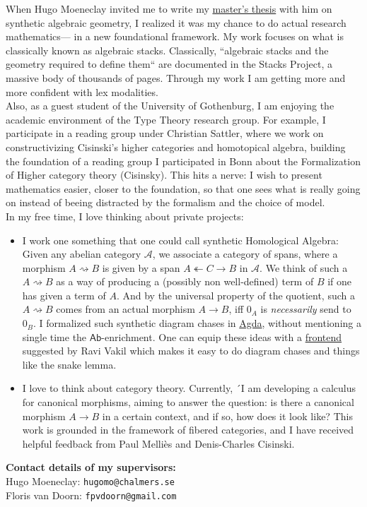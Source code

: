 \documentclass[12pt,headings=small,paper=A4,DIV=calc]{article}
\begin{document}
When Hugo Moeneclay invited me to write my \href{https://github.com/timlichtnau/MasterThesis/blob/Main}{master's thesis} with him on synthetic algebraic geometry, I realized it was my chance to do actual research mathematics--- in a new foundational framework. My work focuses on what is classically known as algebraic stacks. Classically, ``algebraic stacks and the geometry required to define them`` are documented in the Stacks Project, a massive body of thousands of pages. Through my work I am getting more and more confident with lex modalities. \\
Also, as a guest student of the University of Gothenburg, I am enjoying the academic environment of the Type Theory research group. For example, I participate in a reading group under Christian Sattler, where we work on constructivizing Cisinski's higher categories and homotopical algebra, building the foundation of a reading group I participated in Bonn about the Formalization of Higher category theory (Cisinsky). This hits a nerve: I wish to present mathematics easier, closer to the foundation, so that one sees what is really going on instead of beeing distracted by the formalism and the choice of model. \\

In my free time, I love thinking about private projects: 
\begin{itemize}
	\item I work one something that one could call synthetic Homological Algebra: Given any abelian category $\mathcal{A}$, we associate a category of spans, where a morphism $A \rightsquigarrow B$ is given by a span $A \twoheadleftarrow C \to B$ in $\mathcal{A}$. We think of such a $A \rightsquigarrow B$ as a way of producing a (possibly non well-defined) term of $B$ if one has given a term of $A$. And by the universal property of the quotient, such a $A \rightsquigarrow B$ comes from an actual morphism $A \to B$, iff $0_A$ is \emph{necessarily} send to $0_B$. I formalized such synthetic diagram chases in \href{https://github.com/timlichtnau/CarpetsOnAgda/blob/master/}{Agda}, without mentioning a single time the $\mathsf{Ab}$-enrichment. One can equip these ideas with a \href{https://www.3blue1brown.com/content/blog/exact-sequence-picturebook/PuzzlingThroughExactSequences.pdf}{frontend} suggested by Ravi Vakil which makes it easy to do diagram chases and things like the snake lemma. 
	\item  I love to think about category theory. Currently, ´I am developing a calculus for canonical morphisms, aiming to answer the question: is there a canonical morphism $A \to B$ in a certain context, and if so, how does it look like? This work is grounded in the framework of fibered categories, and I have received helpful feedback from Paul Melliès and Denis-Charles Cisinski. \\
\end{itemize}

\textbf{Contact details of my supervisors:} \\
Hugo Moeneclay: \texttt{hugomo@chalmers.se} \\
Floris van Doorn: \texttt{fpvdoorn@gmail.com}
\end{document}
